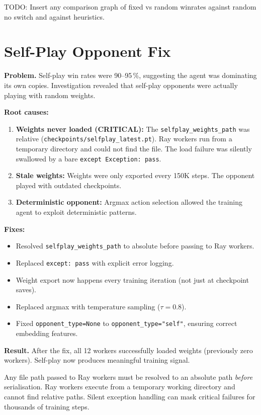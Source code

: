 TODO: Insert any comparison graph of fixed vs random winrates against random no switch and against heuristics.

\section{Self-Play Opponent Fix}

\textbf{Problem.} Self-play win rates were 90--95\,\%, suggesting the agent
was dominating its own copies.  Investigation revealed that self-play
opponents were actually playing with random weights.

\textbf{Root causes:}
\begin{enumerate}
  \item \textbf{Weights never loaded (CRITICAL):} The
        \texttt{selfplay\_weights\_path} was relative
        (\texttt{checkpoints/selfplay\_latest.pt}).  Ray workers run from a
        temporary directory and could not find the file.  The load failure was
        silently swallowed by a bare \texttt{except Exception: pass}.
  \item \textbf{Stale weights:} Weights were only exported every 150K steps.
        The opponent played with outdated checkpoints.
  \item \textbf{Deterministic opponent:} Argmax action selection allowed the
        training agent to exploit deterministic patterns.
\end{enumerate}

\textbf{Fixes:}
\begin{itemize}
  \item Resolved \texttt{selfplay\_weights\_path} to absolute before passing
        to Ray workers.
  \item Replaced \texttt{except: pass} with explicit error logging.
  \item Weight export now happens every training iteration (not just at
        checkpoint saves).
  \item Replaced argmax with temperature sampling ($\tau=0.8$).
  \item Fixed \texttt{opponent\_type=None} to
        \texttt{opponent\_type="self"}, ensuring correct embedding features.
\end{itemize}

\textbf{Result.} After the fix, all 12 workers successfully loaded weights
(previously zero workers).  Self-play now produces meaningful training signal.

\begin{keyinsight}
Any file path passed to Ray workers must be resolved to an absolute path
\emph{before} serialisation.  Ray workers execute from a temporary working
directory and cannot find relative paths.  Silent exception handling can mask
critical failures for thousands of training steps.
\end{keyinsight}

